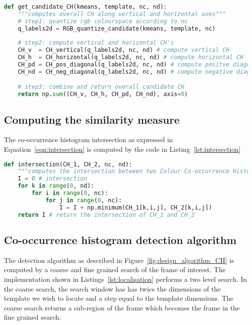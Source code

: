 \begin{lstlisting}[language=Python, caption={Computing candidate CH}, captionpos=b, label={lst:chcand}]
def get_candidate_CH(kmeans, template, nc, nd):
    """computes overall CH along vertical and horizontal axes"""
    # step1: quantize rgb colourspace according to nc
    q_labels2d = RGB_quantize_candidate(kmeans, template, nc)
    
    # step2: compute vertical and horizontal CH's
    CH_v  = CH_vertical(q_labels2d, nc, nd) # compute vertical CH
    CH_h  = CH_horizontal(q_labels2d, nc, nd) # compute horizontal CH
    CH_pd = CH_pos_diagonal(q_labels2d, nc, nd) # compute positve diagonal CH
    CH_nd = CH_neg_diagonal(q_labels2d, nc, nd) # compute negative diagonal CH

    # step3: combine and return overall candidate CH
    return np.sum((CH_v, CH_h, CH_pd, CH_nd), axis=0)
\end{lstlisting}

\subsection{Computing the similarity measure}
The co-occurrence histogram intersection as expressed in
Equation~\ref{eqn:intersection} is computed by the code in
Listing~\ref{lst:intersection}

\begin{lstlisting}[language=Python, caption={Computing intersection of two CCH's}, captionpos=b, label={lst:intersection}]
def intersection(CH_1, CH_2, nc, nd):
    """computes the intersection between two Colour Co-occurrence Histograms""" 
    I = 0 # intersection
    for k in range(0, nd):
        for i in range(0, nc):
            for j in range(0, nc):
                I = I + np.minimum(CH_1[k,i,j], CH_2[k,i,j])
    return I # return the intersection of CH_1 and CH_2
\end{lstlisting}

\subsection{Co-occurrence histogram detection algorithm}
The detection algorithm as described in Figure~\ref{fig:design_algorithm_CH}
is computed by a coarse and fine grained search of the frame of interest. 
The implementation shown in Listings~\ref{lst:localisation} performs a two level
search. In the coarse search, the search window has has twice the dimensions of the
template we wish to locate and a step equal to the template dimensions. The
coarse search returns a sub-region of the frame which becomes the frame in the
fine grained search. 

